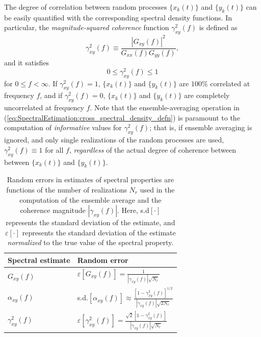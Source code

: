 The degree of correlation between random processes
$\{x_k(t)\}$ and $\{y_k(t)\}$ can be easily quantified
with the corresponding spectral density functions.
In particular, the \emph{magnitude-squared coherence} function
$\gamma_{xy}^2(f)$ is defined as
\begin{equation}
  \gamma_{xy}^2(f)
  \equiv
  \frac{|G_{xy}(f)|^2}{G_{xx}(f) G_{yy}(f)},
  \label{eq:SpectralEstimation:magnitude_squared_coherence_defn}
\end{equation}
and it satisfies
\begin{equation}
  0 \leq \gamma_{xy}^2(f) \leq 1
  \label{eq:SpectralEstimation:magnitude_squared_coherence_bounds}
\end{equation}
for $0 \leq f < \infty$.
If $\gamma_{xy}^2(f) = 1$,
$\{x_k(t)\}$ and $\{y_k(t)\}$ are $100\%$ correlated at frequency $f$, and
if $\gamma_{xy}^2(f) = 0$,
$\{x_k(t)\}$ and $\{y_k(t)\}$ are completely uncorrelated at frequency $f$.
Note that the ensemble-averaging operation in
(\ref{eq:SpectralEstimation:cross_spectral_density_defn})
is paramount to the computation
of \emph{informative} values for $\gamma_{xy}^2(f)$;
that is, if ensemble averaging is ignored, and
only single realizations of the random processes are used,
$\gamma_{xy}^2(f) \equiv 1$ for all $f$,
\emph{regardless} of the actual degree of coherence
between between $\{x_k(t)\}$ and $\{y_k(t)\}$.

\begin{table}[t]
  \centering
  \renewcommand{\arraystretch}{1.5}%
  \begin{tabular}{%
    >{\centering}m{5.0cm} >{\centering}m{5.0cm}
  }
    \toprule%
    \textbf{Spectral estimate}
    & \textbf{Random error} \cite{bendat_and_piersol}
    \tabularnewline%
    \midrule
    $G_{xy}(f)$
    & $\varepsilon \left[G_{xy}(f) \right]
    =
    \frac{1}{|\gamma_{xy}(f)| \sqrt{N_r}}$
    \tabularnewline%
    $\alpha_{xy}(f)$
    & s.d.$\left[ \alpha_{xy}(f) \right]
    \approx
    \frac{[1 - \gamma_{xy}^2(f)]^{1/2}}{|\gamma_{xy}(f)| \sqrt{2 N_r}}$
    \tabularnewline%
    $\gamma_{xy}^2(f)$
    & $\varepsilon \left[ \gamma_{xy}^2(f) \right]
    =
    \frac{\sqrt{2} [1 - \gamma_{xy}^2(f)]}{|\gamma_{xy}(f)| \sqrt{N_r}}$
    \tabularnewline%
    \toprule%
  \end{tabular}
  \caption[Random errors in spectral estimates]{%
    Random errors in estimates of spectral properties are functions of
    the number of realizations $N_r$ used
    in the computation of the ensemble average and
    the coherence magnitude $|\gamma_{xy}(f)|$.
    Here, s.d$[\cdot]$ represents the standard deviation of the estimate, and
    $\varepsilon[\cdot]$ represents the standard deviation of the estimate
    \emph{normalized} to the true value of the spectral property.
    }%
\label{table:ToroidalCorrelation:spectral_estimate_random_errors}
\end{table}

